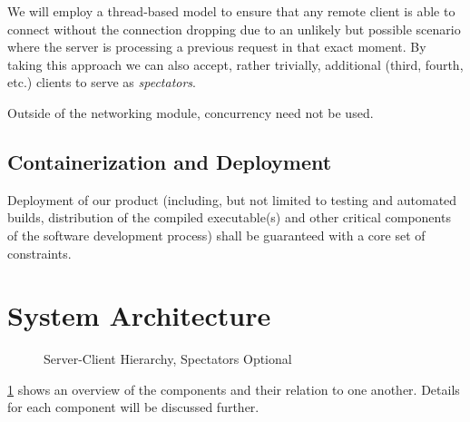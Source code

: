 \documentclass[letterpaper]{article}
\begin{document}
We will employ a thread-based model to ensure that any remote
client is able to connect without the connection dropping due to
an unlikely but possible scenario where the server is processing
a previous request in that exact moment. By taking this approach
we can also accept, rather trivially, additional (third, fourth,
etc.) clients to serve as \emph{spectators}.

Outside of the networking module, concurrency need not be used.

\subsection{Containerization and Deployment}
\label{sec:strategies_deployment}

Deployment of our product (including, but not limited to testing
and automated builds, distribution of the compiled executable(s)
and other critical components of the software development
process) shall be guaranteed with a core set of constraints.


\section{System Architecture}
\label{sec:architecture}

\begin{figure}
    \caption{Server-Client Hierarchy, Spectators Optional}
    \label{fig:diagrams_sch}
\end{figure}

\cref{fig:diagrams_sch} shows an overview of the components
and their relation to one another. Details for each component
will be discussed further.
\end{document}
